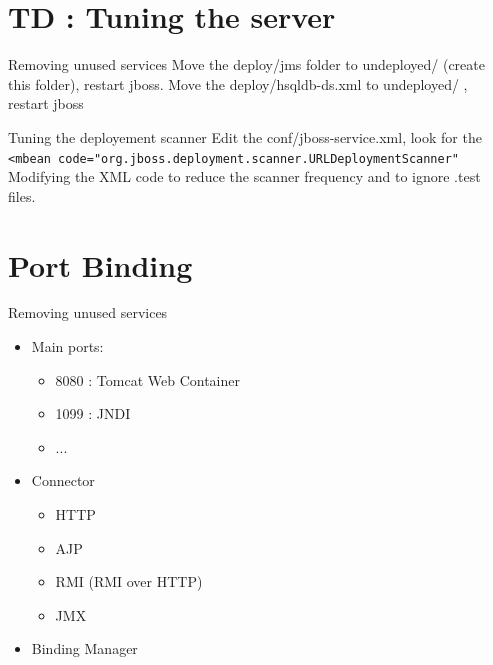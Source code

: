 \documentclass[handout]{beamer}
\begin{document}
\section{TD : Tuning the server}
	\begin{frame}
		\begin{block}{Removing unused services}
			Move the deploy/jms folder to undeployed/ (create this folder), restart jboss.
			Move the deploy/hsqldb-ds.xml to undeployed/ , restart jboss
		\end{block}		
		\begin{block}{Tuning the deployement scanner}
			Edit the conf/jboss-service.xml, look for the \texttt{<mbean code="org.jboss.deployment.scanner.URLDeploymentScanner"}
			Modifying the XML code to reduce the scanner frequency and to ignore .test files.
		\end{block}		
	\end{frame}
\section{Port Binding}
	\begin{frame}
		\begin{block}{Removing unused services}
			\begin{itemize}
 				\item Main ports:
				\begin{itemize}
 					\item 8080 : Tomcat Web Container
					\item 1099 : JNDI
					\item ...
				\end{itemize}
				\item Connector
				\begin{itemize}
					\item HTTP
					\item AJP
				 	\item RMI (RMI over HTTP)
					\item JMX	 
				\end{itemize}
				\item Binding Manager
			\end{itemize}
		\end{block}
	\end{frame}
\end{document}
